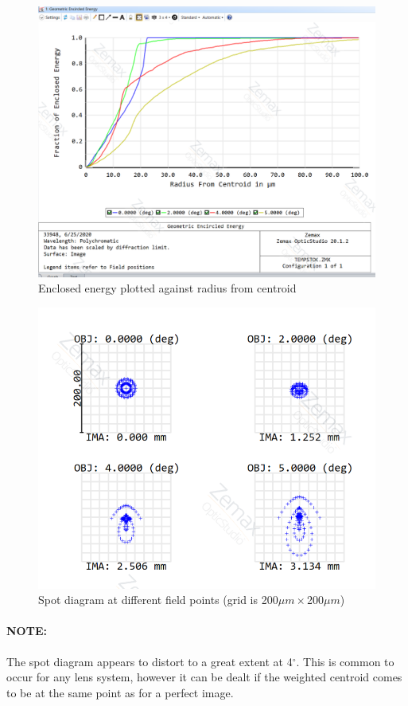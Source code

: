 \documentclass[../../main.tex]{subfiles}
\begin{document}
\begin{figure}[h!]
    \centering
    \includegraphics[width=0.75\linewidth]{Figures/Instrumentation/single_lens_spot_radius_1.PNG}
    \caption{Enclosed energy plotted against radius from centroid}
    \label{fig:single_lens_spot_radius_1}
\end{figure}
\begin{figure}[H]
    \centering
    \includegraphics[width=0.75\linewidth]{Figures/Instrumentation/single_lens_spot_diagram_1.PNG}
    \caption{Spot diagram at different field points (grid is 200$\mu m\times$200$\mu m$) }
    \label{fig:single_lens_spot_diagram_1}
\end{figure}
\paragraph{NOTE:}
The spot diagram appears to distort to a great extent at 4$^{\circ}$. This is common to occur for any lens system, however it can be dealt if the weighted centroid comes to be at the same point as for a perfect image.
\end{document}
